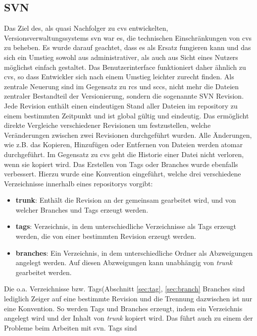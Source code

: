 \subsection{SVN}\label{sec:svn}
Das Ziel des, als quasi Nachfolger zu \acrshort{cvs} entwickelten,
Versionsverwaltungssystems \acrfull{svn} war es, die technischen
Einschränkungen von \acrshort{cvs} zu beheben. Es wurde darauf geachtet, dass
es als Ersatz fungieren kann und das sich ein Umstieg sowohl aus
administrativer, als auch aus Sicht eines Nutzers möglichst einfach gestaltet.
Das Benutzerinterface funktioniert daher ähnlich zu \acrshort{cvs}, so dass
Entwickler sich nach einem Umstieg leichter zurecht finden. Als zentrale
Neuerung sind im Gegensatz zu \acrshort{rcs} und \acrshort{sccs}, nicht mehr
die Dateien zentraler Bestandteil der Versionierung, sondern die sogenannte SVN
Revision. Jede Revision enthält einen eindeutigen Stand aller Dateien im
\gls{repository} zu einem bestimmten Zeitpunkt und ist global gültig und
eindeutig. Das ermöglicht direkte Vergleiche verschiedener Revisionen um
festzustellen, welche Veränderungen zwischen zwei Revisionen durchgeführt
wurden. Alle Änderungen, wie z.B. das Kopieren, Hinzufügen oder Entfernen von
Dateien werden atomar durchgeführt. Im Gegensatz zu \acrshort{cvs} geht die
Historie einer Datei nicht verloren, wenn sie kopiert wird. Das Erstellen von
Tags oder Branches wurde ebenfalls verbessert. Hierzu wurde eine Konvention
eingeführt, welche drei verschiedene Verzeichnisse innerhalb eines
\glspl{repository} vorgibt:
\begin{itemize}
\item \textbf{trunk}: Enthält die Revision an der gemeinsam gearbeitet wird,
       und von welcher Branches und Tags erzeugt werden.
\item \textbf{tags}: Verzeichnis, in dem unterschiedliche Verzeichnisse als
       Tags erzeugt werden, die von einer bestimmten Revision erzeugt werden.
\item \textbf{branches}: Ein Verzeichnis, in dem unterschiedliche Ordner als
      Abzweigungen angelegt werden. Auf diesen Abzweigungen kann unabhängig von
      \textit{trunk} gearbeitet werden.
\end{itemize}
Die o.a. Verzeichnisse bzw. Tags(Abschnitt \ref{sec:tag}, \ref{sec:branch} Branches
sind lediglich Zeiger auf eine bestimmte Revision und die Trennung dazwischen
ist nur eine Konvention. So werden Tags und Branches erzeugt, indem ein
Verzeichnis angelegt wird und der Inhalt von \textit{trunk} kopiert wird. Das
führt auch zu einem der Probleme beim Arbeiten mit \acrlong{svn}. Tags sind
